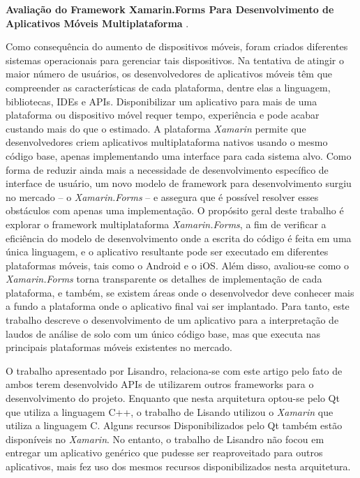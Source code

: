 \textbf{Avaliação do Framework Xamarin.Forms Para Desenvolvimento de Aplicativos Móveis Multiplataforma} \cite{lisandroprocedi}.\par
Como consequência do aumento de dispositivos móveis, foram criados diferentes sistemas operacionais para gerenciar tais dispositivos. Na tentativa de atingir o maior número de usuários, os desenvolvedores de aplicativos móveis têm que compreender as características de cada plataforma, dentre elas a linguagem, bibliotecas, IDEs e APIs. Disponibilizar um aplicativo para mais de uma plataforma ou dispositivo móvel requer tempo, experiência e pode acabar custando mais do que o estimado. A plataforma \textit{Xamarin} permite que desenvolvedores criem aplicativos multiplataforma nativos usando o mesmo código base, apenas implementando uma interface para cada sistema alvo. Como forma de reduzir ainda mais a necessidade de desenvolvimento específico de interface de usuário, um novo modelo de framework para desenvolvimento surgiu no mercado – o \textit{Xamarin.Forms} – e assegura que é possível resolver esses obstáculos com apenas uma implementação. O propósito geral deste trabalho é explorar o framework multiplataforma \textit{Xamarin.Forms}, a fim de verificar a eficiência do modelo de desenvolvimento onde a escrita do código é feita em uma única linguagem, e o aplicativo resultante pode ser executado em diferentes plataformas móveis, tais como o Android e o iOS. Além disso, avaliou-se como o \textit{Xamarin.Forms} torna transparente os detalhes de implementação de cada plataforma, e também, se existem áreas onde o desenvolvedor deve conhecer mais a fundo a plataforma onde o aplicativo final vai ser implantado. Para tanto, este trabalho descreve o desenvolvimento de um aplicativo para a interpretação de laudos de análise de solo com um único código base, mas que executa nas principais plataformas móveis existentes no mercado.\par

O trabalho apresentado por Lisandro, relaciona-se com este artigo pelo fato de ambos terem desenvolvido APIs de utilizarem outros frameworks para o desenvolvimento do projeto. Enquanto que nesta arquitetura optou-se pelo Qt que utiliza a linguagem C++, o trabalho de Lisando utilizou o \textit{Xamarin} que utiliza a linguagem C\myhash. Alguns recursos Disponibilizados pelo Qt também estão disponíveis no \textit{Xamarin}. No entanto, o trabalho de Lisandro não focou em entregar um aplicativo genérico que pudesse ser reaproveitado para outros aplicativos, mais fez uso dos mesmos recursos disponibilizados nesta arquitetura.\par

